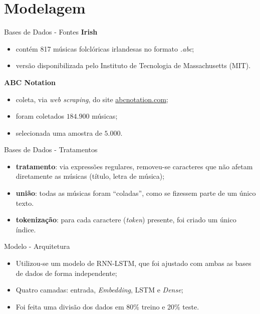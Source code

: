 \documentclass[xcolor=table]{beamer}
\begin{document}
\section{Modelagem}
    \begin{frame}{Bases de Dados - Fontes}
        \textbf{Irish}
        \begin{itemize}
            \justifying
            \item contém 817 músicas folclóricas irlandesas no formato \textit{.abc};
            \item versão disponibilizada pelo Instituto de Tecnologia de Massachusetts (MIT).
        \end{itemize}
        
        \textbf{ABC Notation}
        \begin{itemize}
            \justifying
            \item coleta, via \textit{web scraping}, do site \href{https://abcnotation.com/}{abcnotation.com};
            \item foram coletados $184.900$ músicas;
            \item selecionada uma amostra de $5.000$.
        \end{itemize}
    \end{frame}

    \begin{frame}{Bases de Dados - Tratamentos}
        \begin{itemize}
            \justifying
            \item \textbf{tratamento}: via expressões regulares, removeu-se caracteres que não afetam diretamente as músicas (título, letra de música);
            \item \textbf{união}: todas as músicas foram ``coladas'', como se fizessem parte de um único texto.
            \item \textbf{tokenização}: para cada caractere (\textit{token}) presente, foi criado um único índice.
        \end{itemize}
    \end{frame}

    \begin{frame}{Modelo - Arquitetura}
        \begin{itemize}
            \justifying
            \item Utilizou-se um modelo de RNN-LSTM, que foi ajustado com ambas as bases de dados de forma independente;
            \item Quatro camadas: entrada, \textit{Embedding}, LSTM e \textit{Dense};
            \item Foi feita uma divisão dos dados em 80\% treino e 20\% teste.
        \end{itemize}
    \end{frame}
\end{document}
